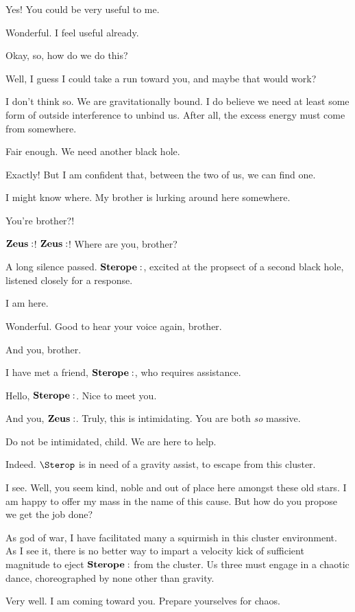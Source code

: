 \Sterope Yes!  You could be very useful to me.  

\Ares Wonderful.  I feel useful already.

\Sterope Okay, so, how do we do this?

\Ares Well, I guess I could take a run toward you, and maybe that would work?

\Sterope I don't think so.  We are gravitationally bound.  I do believe we need at least some form of outside interference to unbind us.  After all, the excess energy must come from somewhere.

\Ares Fair enough.  We need another black hole.

\Sterope Exactly!  But I am confident that, between the two of us, we can find one.

\Ares I might know where.  My brother is lurking around here somewhere. 

\Sterope You're brother?!

\Ares $\Zeus$! $\Zeus$!  Where are you, brother?

A long silence passed.  $\Sterope$, excited at the propsect of a second black hole, listened closely for a response.

\Zeus I am here.   

\Ares  Wonderful.  Good to hear your voice again, brother.

\Zeus And you, brother.

\Ares I have met a friend, $\Sterope$, who requires assistance.

\Zeus  Hello, $\Sterope$.  Nice to meet you.

\Sterope And you, $\Zeus$.  Truly, this is intimidating.  You are both \textit{so} massive.

\Zeus Do not be intimidated, child.  We are here to help.

\Ares Indeed.  $\Sterop$ is in need of a gravity assist, to escape from this cluster.

\Zeus I see.  Well, you seem kind, noble and out of place here amongst these old stars.  I am happy to offer my mass in the name of this cause.  But how do you propose we get the job done?

\Ares As god of war, I have facilitated many a squirmish in this cluster environment.  As I see it, there is no better way to impart a velocity kick of sufficient magnitude to eject $\Sterope$ from the cluster.  Us three must engage in a chaotic dance, choreographed by none other than gravity.

\Zeus  Very well.  I am coming toward you.  Prepare yourselves for chaos.

